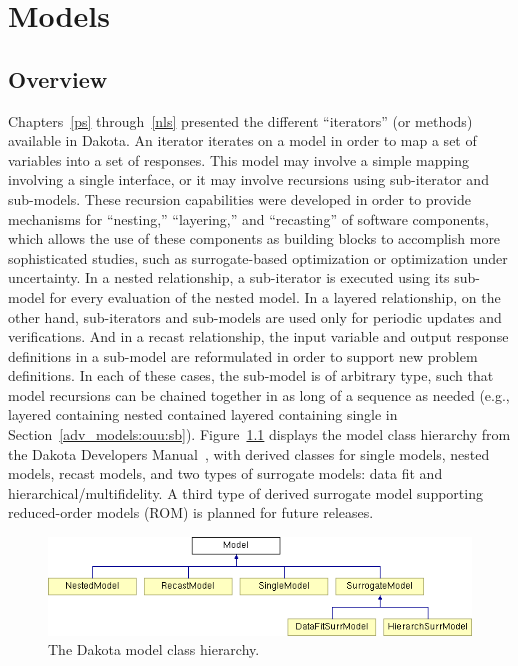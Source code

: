 \chapter{Models}\label{models}

\section{Overview}\label{models:overview}

Chapters~\ref{ps} through~\ref{nls} presented the different
``iterators'' (or methods) available in Dakota.  An iterator iterates
on a model in order to map a set of variables into a set of responses.
This model may involve a simple mapping involving a single interface,
or it may involve recursions using sub-iterator and sub-models.  These
recursion capabilities were developed in order to provide mechanisms
for ``nesting,'' ``layering,'' and ``recasting'' of software
components, which allows the use of these components as building
blocks to accomplish more sophisticated studies, such as
surrogate-based optimization or optimization under uncertainty.  In a
nested relationship, a sub-iterator is executed using its sub-model
for every evaluation of the nested model.  In a layered relationship,
on the other hand, sub-iterators and sub-models are used only for
periodic updates and verifications.  And in a recast relationship, the
input variable and output response definitions in a sub-model are
reformulated in order to support new problem definitions.  In each of
these cases, the sub-model is of arbitrary type, such that model
recursions can be chained together in as long of a sequence as needed
(e.g., layered containing nested contained layered containing single
in Section~\ref{adv_models:ouu:sb}).  Figure~\ref{model:hier} displays
the model class hierarchy from the Dakota Developers
Manual~\cite{DevMan}, with derived classes for single models, nested
models, recast models, and two types of surrogate models: data fit and
hierarchical/multifidelity.  A third type of derived surrogate model
supporting reduced-order models (ROM) is planned for future releases.

\begin{figure}
  \centering \includegraphics[scale=0.65]{images/classDakota_1_1Model}
  \caption{The Dakota model class hierarchy.}  \label{model:hier}
\end{figure}


